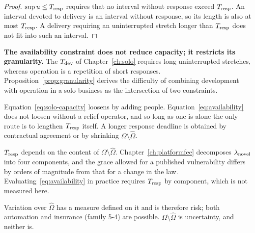 \begin{proof}
$\sup u\leq T_{\rm resp}$ requires that no interval without response exceed $T_{\rm resp}$.
An interval devoted to delivery is an interval without response, so its length is also at
most $T_{\rm resp}$. A delivery requiring an uninterrupted stretch longer than
$T_{\rm resp}$ does not fit into such an interval.
\end{proof}

\textbf{The availability constraint does not reduce capacity; it restricts its granularity.}
The $T_{\rm dev}$ of Chapter~\ref{ch:solo} requires long uninterrupted stretches, whereas
operation is a repetition of short responses. Proposition~\ref{prop:granularity} derives the
difficulty of combining development with operation in a solo business as the intersection of
two constraints.

\begin{remark}
Equation~\eqref{eq:solo-capacity} loosens by adding people.
Equation~\eqref{eq:availability} does not loosen without a relief operator, and so long as
one is alone the only route is to lengthen $T_{\rm resp}$ itself. A longer response deadline
is obtained by contractual agreement or by shrinking $\Omega\setminus\hat\Omega$.
\end{remark}

\begin{remark}
\label{rem:tresp-components}
$T_{\rm resp}$ depends on the content of $\Omega\setminus\hat\Omega$.
Chapter~\ref{ch:platformfee} decomposes $\lambda_{\rm novel}$ into four components, and the
grace allowed for a published vulnerability differs by orders of magnitude from that for a
change in the law. Evaluating~\eqref{eq:availability} in practice requires $T_{\rm resp}$ by
component, which is not measured here.
\end{remark}

\begin{remark}
\label{rem:knight}
Variation over $\hat\Omega$ has a measure defined on it and is therefore risk; both
automation and insurance (family 5-4) are possible. $\Omega\setminus\hat\Omega$ is
uncertainty, and neither is.
\end{remark}

